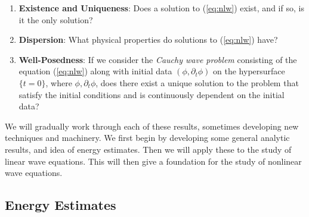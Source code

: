 \documentclass{article}
\begin{document}
\begin{enumerate}[itemsep =-2pt,label = (\roman{*})]
	\item \textbf{Existence and Uniqueness}: Does a solution to (\ref{eq:nlw}) exist, and if so, is it the only solution? 
	\item \textbf{Dispersion}: What physical properties do solutions to (\ref{eq:nlw}) have? 
	\item \textbf{Well-Posedness}: If we consider the \textit{Cauchy wave problem} consisting of the equation (\ref{eq:nlw}) along with initial data $(\phi, \partial_{t}\phi)$ on the hypersurface $\{t = 0\}$, where $\phi, \partial_{t}\phi$, does there exist a unique solution to the problem that satisfy the initial conditions and is continuously dependent on the initial data?
\end{enumerate}

We will gradually work through each of these results, sometimes developing new techniques and machinery. We first begin by developing some general analytic results, and idea of energy estimates. Then we will apply these to the study of linear wave equations. This will then give a foundation for the study of nonlinear wave equations. 




\newpage 
\subsection{Energy Estimates}
\end{document}
